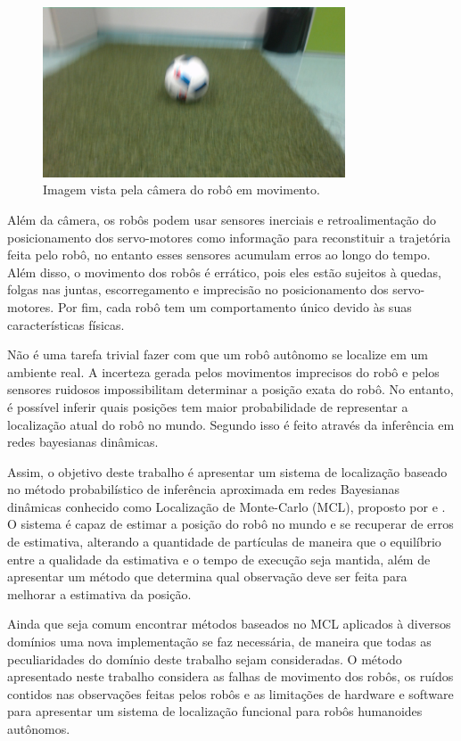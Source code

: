 \documentclass[
  12pt,       %
  oneside,
  a4paper,      %
  english,      %
  french,       %
  spanish,      %
  brazil,       %
  ]{abntex2}
\begin{document}
\begin{figure}[t]
  \centering
  \caption{Imagem vista pela câmera do robô em movimento.}\label{fig:visioncamera}
    \includegraphics[width=0.8\textwidth, height=0.45\textwidth]{fig/foto}
\end{figure}

Além da câmera, os robôs podem usar sensores inerciais e retroalimentação do posicionamento dos servo-motores como informação para reconstituir a trajetória feita pelo robô, no entanto esses sensores acumulam erros ao longo do tempo.
Além disso, o movimento dos robôs é errático, pois eles estão sujeitos à quedas, folgas nas juntas, escorregamento e imprecisão no posicionamento dos servo-motores.
Por fim, cada robô tem um comportamento único devido às suas características físicas.

Não é uma tarefa trivial fazer com que um robô autônomo se localize em um ambiente real.
A incerteza gerada pelos movimentos imprecisos do robô e pelos sensores ruidosos impossibilitam determinar a posição exata do robô.
No entanto, é possível inferir quais posições tem maior probabilidade de representar a localização atual do robô no mundo.
Segundo  isso é feito através da inferência em redes bayesianas dinâmicas.

Assim, o objetivo deste trabalho é apresentar um sistema de localização baseado no método probabilístico de inferência aproximada em redes Bayesianas dinâmicas conhecido como Localização de Monte-Carlo (MCL), proposto por  e .
O sistema é capaz de estimar a posição do robô no mundo e se recuperar de erros de estimativa, alterando a quantidade de partículas de maneira que o equilíbrio entre a qualidade da estimativa e o tempo de execução seja mantida, além de apresentar um método que determina qual observação deve ser feita para melhorar a estimativa da posição.

Ainda que seja comum encontrar métodos baseados no MCL aplicados à diversos domínios uma nova implementação se faz necessária, de maneira que todas as peculiaridades do domínio deste trabalho sejam consideradas.
O método apresentado neste trabalho considera as falhas de movimento dos robôs, os ruídos contidos nas observações feitas pelos robôs e as limitações de hardware e software para apresentar um sistema de localização funcional para robôs humanoides autônomos.
\end{document}
